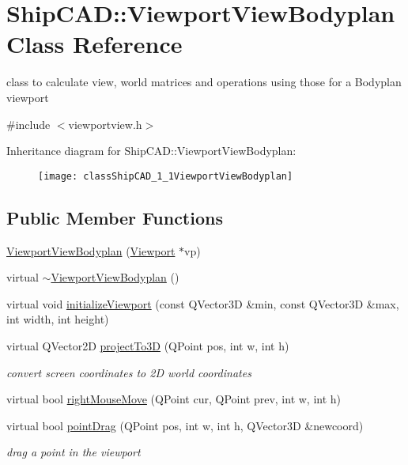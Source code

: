 \hypertarget{classShipCAD_1_1ViewportViewBodyplan}{}\section{Ship\+C\+AD\+:\+:Viewport\+View\+Bodyplan Class Reference}
\label{classShipCAD_1_1ViewportViewBodyplan}


class to calculate view, world matrices and operations using those for a Bodyplan viewport  




{\ttfamily \#include $<$viewportview.\+h$>$}

Inheritance diagram for Ship\+C\+AD\+:\+:Viewport\+View\+Bodyplan\+:\begin{figure}[H]
\begin{center}
\leavevmode
\texttt{[image: classShipCAD\_1\_1ViewportViewBodyplan]}
\end{center}
\end{figure}
\subsection*{Public Member Functions}
\begin{DoxyCompactItemize}
\item 
\hyperlink{classShipCAD_1_1ViewportViewBodyplan_af7c21d420e2764eca26a1b2905fc0a9c}{Viewport\+View\+Bodyplan} (\hyperlink{classShipCAD_1_1Viewport}{Viewport} $\ast$vp)
\item 
virtual \hyperlink{classShipCAD_1_1ViewportViewBodyplan_a0e5644ebc58b2b6ca144c3c1e81c826e}{$\sim$\+Viewport\+View\+Bodyplan} ()
\item 
virtual void \hyperlink{classShipCAD_1_1ViewportViewBodyplan_aaa33b893fbff1c2899d5779fc3b78d1e}{initialize\+Viewport} (const Q\+Vector3D \&min, const Q\+Vector3D \&max, int width, int height)
\item 
virtual Q\+Vector2D \hyperlink{classShipCAD_1_1ViewportViewBodyplan_a919c765ec9749814bac1ef0a3b3e8ef1}{project\+To3D} (Q\+Point pos, int w, int h)
\begin{DoxyCompactList}\small\item\em convert screen coordinates to 2D world coordinates \end{DoxyCompactList}\item 
virtual bool \hyperlink{classShipCAD_1_1ViewportViewBodyplan_acbc25d95fff9310b5cf5cfa1c5dd5210}{right\+Mouse\+Move} (Q\+Point cur, Q\+Point prev, int w, int h)
\item 
virtual bool \hyperlink{classShipCAD_1_1ViewportViewBodyplan_af10d2ce23c6634a6f5824e49f678998b}{point\+Drag} (Q\+Point pos, int w, int h, Q\+Vector3D \&newcoord)
\begin{DoxyCompactList}\small\item\em drag a point in the viewport \end{DoxyCompactList}\end{DoxyCompactItemize}
